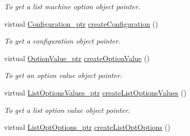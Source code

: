 \begin{DoxyCompactItemize}
\begin{DoxyCompactList}\small\item\em To get a list machine option object pointer. \item\end{DoxyCompactList}\item 
\hypertarget{classUMS__Data_1_1UMS__DataFactory_a9a97ba378ec36d30822fcb81202213e5}{
virtual \hyperlink{classUMS__Data_1_1Configuration}{Configuration\_\-ptr} \hyperlink{classUMS__Data_1_1UMS__DataFactory_a9a97ba378ec36d30822fcb81202213e5}{createConfiguration} ()}
\label{classUMS__Data_1_1UMS__DataFactory_a9a97ba378ec36d30822fcb81202213e5}

\begin{DoxyCompactList}\small\item\em To get a configuration object pointer. \item\end{DoxyCompactList}\item 
\hypertarget{classUMS__Data_1_1UMS__DataFactory_afdf3c0d6f83156c9656b2eb857affcdb}{
virtual \hyperlink{classUMS__Data_1_1OptionValue}{OptionValue\_\-ptr} \hyperlink{classUMS__Data_1_1UMS__DataFactory_afdf3c0d6f83156c9656b2eb857affcdb}{createOptionValue} ()}
\label{classUMS__Data_1_1UMS__DataFactory_afdf3c0d6f83156c9656b2eb857affcdb}

\begin{DoxyCompactList}\small\item\em To get an option value object pointer. \item\end{DoxyCompactList}\item 
\hypertarget{classUMS__Data_1_1UMS__DataFactory_a902c49508dea0cd7713bb5353e3860f1}{
virtual \hyperlink{classUMS__Data_1_1ListOptionsValues}{ListOptionsValues\_\-ptr} \hyperlink{classUMS__Data_1_1UMS__DataFactory_a902c49508dea0cd7713bb5353e3860f1}{createListOptionsValues} ()}
\label{classUMS__Data_1_1UMS__DataFactory_a902c49508dea0cd7713bb5353e3860f1}

\begin{DoxyCompactList}\small\item\em To get a list option value object pointer. \item\end{DoxyCompactList}\item 
\hypertarget{classUMS__Data_1_1UMS__DataFactory_af12ce6aa0d8508775f0ea21bd0a6492b}{
virtual \hyperlink{classUMS__Data_1_1ListOptOptions}{ListOptOptions\_\-ptr} \hyperlink{classUMS__Data_1_1UMS__DataFactory_af12ce6aa0d8508775f0ea21bd0a6492b}{createListOptOptions} ()}
\label{classUMS__Data_1_1UMS__DataFactory_af12ce6aa0d8508775f0ea21bd0a6492b}


\end{DoxyCompactItemize}
